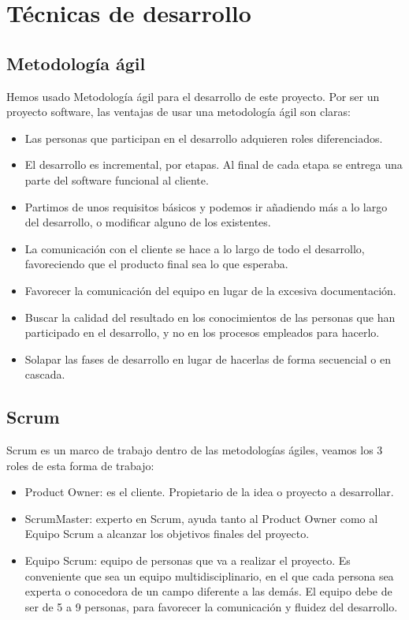 
\section{Técnicas de desarrollo}

\subsection{Metodología ágil}
Hemos usado Metodología ágil para el desarrollo de este proyecto.
Por ser un proyecto software, las ventajas de usar una metodología ágil\cite{met_agil} son claras:

\begin{itemize}
	\item Las personas que participan en el desarrollo adquieren roles diferenciados.
	\item El desarrollo es incremental, por etapas. Al final de cada etapa se entrega una parte del software funcional al cliente.
	\item Partimos de unos requisitos básicos y podemos ir añadiendo más a lo largo del desarrollo, o modificar alguno de los existentes.
	\item La comunicación con el cliente se hace a lo largo de todo el desarrollo, favoreciendo que el producto final sea lo que esperaba.
	\item Favorecer la comunicación del equipo en lugar de la excesiva documentación.
	\item Buscar la calidad del resultado en los conocimientos de las personas que han participado en el desarrollo, y no en los procesos empleados para hacerlo.
	\item Solapar las fases de desarrollo en lugar de hacerlas de forma secuencial o en cascada.
\end{itemize}

\subsection{Scrum}
Scrum\cite{scrum} es un marco de trabajo dentro de las metodologías ágiles, veamos los 3 roles de esta forma de trabajo:

\begin{itemize}
	\item Product Owner: es el cliente. Propietario de la idea o proyecto a desarrollar. 
	\item ScrumMaster: experto en Scrum, ayuda tanto al Product Owner como al Equipo Scrum a alcanzar los objetivos finales del proyecto.
	\item Equipo Scrum: equipo de personas que va a realizar el proyecto. Es conveniente que sea un equipo multidisciplinario, en el que cada persona sea experta o conocedora de un campo diferente a las demás. El equipo debe de ser de 5 a 9 personas, para favorecer la comunicación y fluidez del desarrollo.
\end{itemize}

